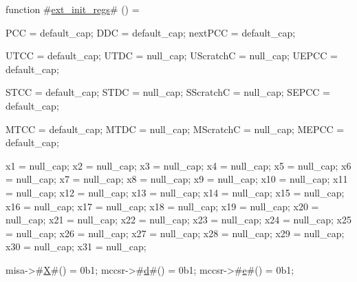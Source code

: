 function #\hyperref[sailRISCVzextzyinitzyregs]{ext\_init\_regs}# () = {
  PCC = default_cap;
  DDC = default_cap;
  nextPCC = default_cap;

  UTCC = default_cap;
  UTDC = null_cap;
  UScratchC = null_cap;
  UEPCC = default_cap;

  STCC = default_cap;
  STDC = null_cap;
  SScratchC = null_cap;
  SEPCC = default_cap;

  MTCC = default_cap;
  MTDC = null_cap;
  MScratchC = null_cap;
  MEPCC = default_cap;

  x1  = null_cap;
  x2  = null_cap;
  x3  = null_cap;
  x4  = null_cap;
  x5  = null_cap;
  x6  = null_cap;
  x7  = null_cap;
  x8  = null_cap;
  x9  = null_cap;
  x10 = null_cap;
  x11 = null_cap;
  x12 = null_cap;
  x13 = null_cap;
  x14 = null_cap;
  x15 = null_cap;
  x16 = null_cap;
  x17 = null_cap;
  x18 = null_cap;
  x19 = null_cap;
  x20 = null_cap;
  x21 = null_cap;
  x22 = null_cap;
  x23 = null_cap;
  x24 = null_cap;
  x25 = null_cap;
  x26 = null_cap;
  x27 = null_cap;
  x28 = null_cap;
  x29 = null_cap;
  x30 = null_cap;
  x31 = null_cap;

  misa->#\hyperref[sailRISCVzX]{X}#() = 0b1;
  mccsr->#\hyperref[sailRISCVzd]{d}#() = 0b1;
  mccsr->#\hyperref[sailRISCVze]{e}#() = 0b1;
}
